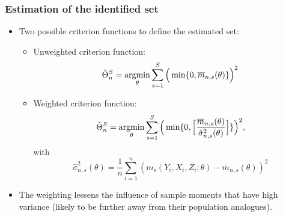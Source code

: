 \documentclass[10pt,letterpaper]{beamer}
\begin{document}
\begin{frame}
\frametitle{Estimation of the identified set}

\begin{itemize}
\item Two possible criterion functions to define the estimated set: 

\begin{itemize}
\item Unweighted criterion function:  
\begin{equation*}
\hat{\Theta}^{S}_{n} = \operatornamewithlimits{argmin}_{\theta}\sum_{s=1}^{S}%
\Big(\min\{0,\overline{m}_{n,s}(\theta)\}\Big)^{2}
\end{equation*}

\item Weighted criterion function:  
\begin{equation*}
\hat{\Theta}^{S}_{n} = \operatornamewithlimits{argmin}_{\theta}\sum_{s=1}^{S}%
\Big(\min\{0,\Big[\frac{\overline{m}_{n,s}(\theta)}{\hat{\sigma}%
^{2}_{n,s}(\theta)}\Big]\}\Big)^{2},
\end{equation*}
with  
\begin{equation*}
\hat{\sigma}^{2}_{n,s}(\theta)=\frac{1}{n}%
\sum_{i=1}^{n}(m_{s}(Y_{i},X_{i},Z_{i};\theta)-\overline{m}%
_{n,s}(\theta))^{2}
\end{equation*}
\end{itemize}

\item The weighting lessens the influence of sample moments that have high
variance (likely to be further away from their population analogues).
\end{itemize}
\end{frame}

\end{document}

